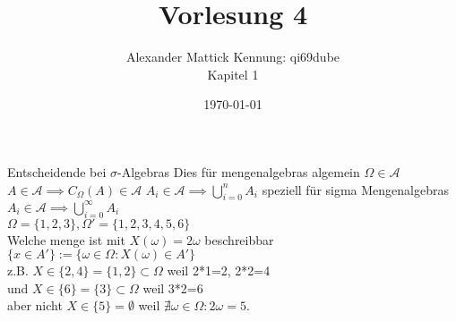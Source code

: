 \documentclass{article}
\author{
Alexander Mattick Kennung: qi69dube\\
Kapitel 1
}
\date{\today}
\title{Vorlesung 4}
\begin{document}
	\maketitle
	Entscheidende bei $\sigma$-Algebras
	Dies für mengenalgebras algemein
	$\Omega\in\mathscr{A}$
	$A\in\mathscr{A}\implies C_\Omega(A)\in\mathscr{A}$
	$A_i\in\mathscr{A}\implies \bigcup\limits^n_{i=0} A_i$
	speziell für sigma Mengenalgebras\\
	$A_i\in\mathscr{A}\implies \bigcup\limits^\infty_{i=0} A_i$\\
	$\Omega = \{1,2,3\}, \Omega'=\{1,2,3,4,5,6\}$\\
	Welche menge ist mit $X(\omega)=2\omega$ beschreibbar\\
	$\{x\in A'\}:= \{\omega\in\Omega: X(\omega)\in A'\}$\\
	z.B. $X\in\{2,4\} = \{1,2\}\subset \Omega$ weil 2*1=2, 2*2=4\\
	und $X\in\{6\} = \{3\}\subset \Omega$ weil 3*2=6\\
	aber nicht $X\in\{5\}=\emptyset$ weil $\nexists \omega\in\Omega: 2\omega=5$.\\
\end{document}
